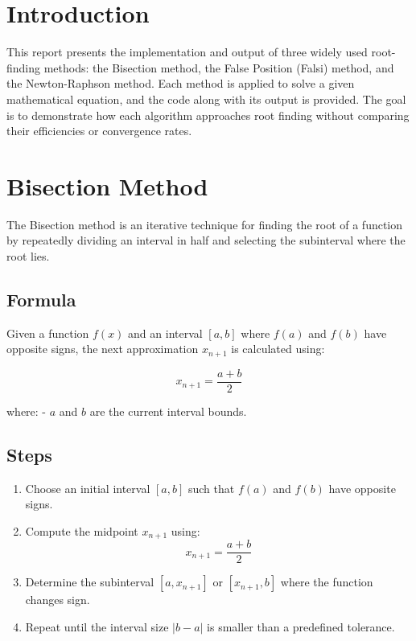 \documentclass{scrreprt}
\begin{document}
\begin{titlepage}
    \date{\today}
    \vfill
\end{titlepage}

\section*{Introduction}
This report presents the implementation and output of three widely used root-finding methods: the Bisection method, the False Position (Falsi) method, and the Newton-Raphson method. Each method is applied to solve a given mathematical equation, and the code along with its output is provided. The goal is to demonstrate how each algorithm approaches root finding without comparing their efficiencies or convergence rates.

\section*{Bisection Method}

The Bisection method is an iterative technique for finding the root of a function by repeatedly dividing an interval in half and selecting the subinterval where the root lies.

\subsection*{Formula}

Given a function \( f(x) \) and an interval \([a, b]\) where \( f(a) \) and \( f(b) \) have opposite signs, the next approximation \( x_{n+1} \) is calculated using:

\begin{equation}
x_{n+1} = \frac{a + b}{2}
\end{equation}

where:
- \( a \) and \( b \) are the current interval bounds.

\subsection*{Steps}

\begin{enumerate}
    \item Choose an initial interval \([a, b]\) such that \( f(a) \) and \( f(b) \) have opposite signs.
    \item Compute the midpoint \( x_{n+1} \) using:
    \begin{equation}
    x_{n+1} = \frac{a + b}{2}
    \end{equation}
    \item Determine the subinterval \([a, x_{n+1}]\) or \([x_{n+1}, b]\) where the function changes sign.
    \item Repeat until the interval size \( |b - a| \) is smaller than a predefined tolerance.
\end{enumerate}
\end{document}
